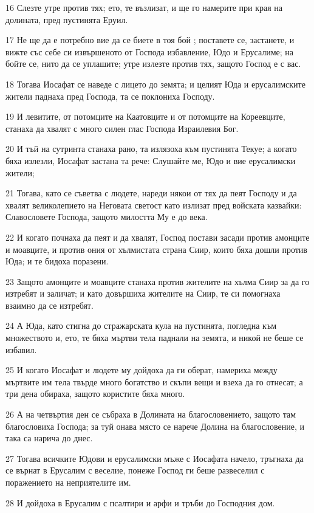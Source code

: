 \par 16 Слезте утре против тях; ето, те възлизат, и ще го намерите при края на долината, пред пустинята Еруил.
\par 17 Не ще да е потребно вие да се биете в тоя бой ; поставете се, застанете, и вижте със себе си извършеното от Господа избавление, Юдо и Ерусалиме; на бойте се, нито да се уплашите; утре излезте против тях, защото Господ е с вас.
\par 18 Тогава Иосафат се наведе с лицето до земята; и целият Юда и ерусалимските жители паднаха пред Господа, та се поклониха Господу.
\par 19 И левитите, от потомците на Каатовците и от потомците на Кореевците, станаха да хвалят с много силен глас Господа Израилевия Бог.
\par 20 И тъй на сутринта станаха рано, та излязоха към пустинята Текуе; а когато бяха излезли, Иосафат застана та рече: Слушайте ме, Юдо и вие ерусалимски жители;
\par 21 Тогава, като се съветва с людете, нареди някои от тях да пеят Господу и да хвалят великолепието на Неговата светост като излизат пред войската казвайки: Славословете Господа, защото милостта Му е до века.
\par 22 И когато почнаха да пеят и да хвалят, Господ постави засади против амонците и моавците, и против ония от хълмистата страна Сиир, които бяха дошли против Юда; и те бидоха поразени.
\par 23 Защото амонците и моавците станаха против жителите на хълма Сиир за да го изтребят и заличат; и като довършиха жителите на Сиир, те си помогнаха взаимно да се изтребят.
\par 24 А Юда, като стигна до стражарската кула на пустинята, погледна към множеството и, ето, те бяха мъртви тела паднали на земята, и никой не беше се избавил.
\par 25 И когато Иосафат и людете му дойдоха да ги оберат, намериха между мъртвите им тела твърде много богатство и скъпи вещи и взеха да го отнесат; а три дена обираха, защото користите бяха много.
\par 26 А на четвъртия ден се събраха в Долината на благословението, защото там благословиха Господа; за туй онава място се нарече Долина на благословение, и така са нарича до днес.
\par 27 Тогава всичките Юдови и ерусалимски мъже с Иосафата начело, тръгнаха да се върнат в Ерусалим с веселие, понеже Господ ги беше развеселил с поражението на неприятелите им.
\par 28 И дойдоха в Ерусалим с псалтири и арфи и тръби до Господния дом.
